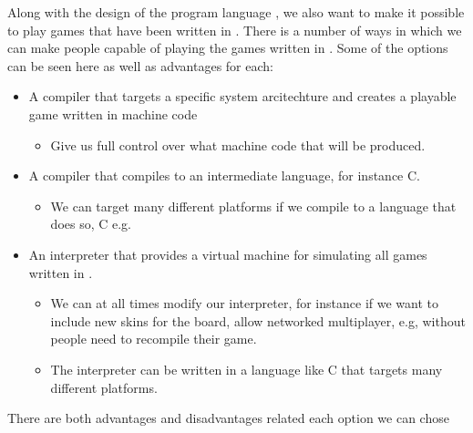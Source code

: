 Along with the design of the program language \productname, we also want to make it possible to play games that have been written in \productname. There is a number of ways in which we can make people capable of playing the games written in \productname. Some of the options can be seen here as well as advantages for each:
\begin{itemize}
\item A \productname compiler that targets a specific system arcitechture and creates a playable game written in machine code
\begin{itemize}
\item Give us full control over what machine code that will be produced.
\end{itemize}
\item A \productname compiler that compiles to an intermediate language, for instance C.
\begin{itemize}
\item We can target many different platforms if we compile to a language that does so, C e.g.
\end{itemize}
\item An interpreter that provides a virtual machine for simulating all games written in \productname.
\begin{itemize}
\item We can at all times modify our interpreter, for instance if we want to include new skins for the board, allow networked multiplayer, e.g, without people need to recompile their game. 
\item The interpreter can be written in a language like C that targets many different platforms.
\end{itemize}
\end{itemize}
There are both advantages and disadvantages related each option we can chose